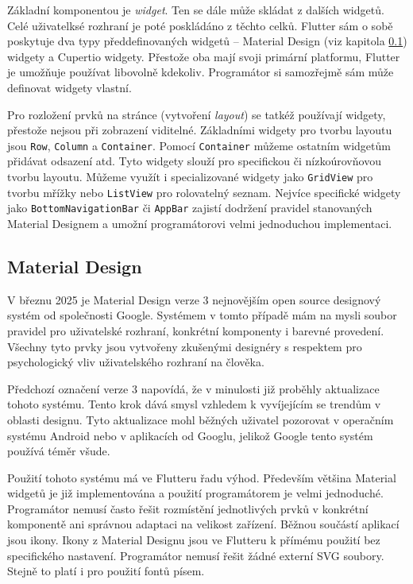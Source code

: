 \documentclass[
  biblatex,
  figures=true,
  tables=false,
  glossaries,
  index
]{kidiplom}
\begin{document}
Základní komponentou je \textit{widget}. Ten se dále může skládat z dalších widgetů. Celé uživatelksé rozhraní je poté poskládáno z těchto celků. Flutter sám o sobě poskytuje dva typy předdefinovaných widgetů -- Material Design (viz kapitola \ref{Material Design}) widgety a Cupertio widgety. Přestože oba mají svoji primární platformu, Flutter je umožňuje používat libovolně kdekoliv. Programátor si samozřejmě sám může definovat widgety vlastní.

Pro rozložení prvků na stránce (vytvoření \textit{layout}) se tatkéž používají widgety, přestože nejsou při zobrazení viditelné. Základními widgety pro tvorbu layoutu jsou \verb|Row|, \verb|Column| a \verb|Container|. Pomocí \verb|Container| můžeme ostatním widgetům přidávat odsazení atd. Tyto widgety slouží pro specifickou či nízkoúrovňovou tvorbu layoutu. Můžeme využít i specializované widgety jako \verb|GridView| pro tvorbu mřížky nebo \verb|ListView| pro rolovatelný seznam. Nejvíce specifické widgety jako \verb|BottomNavigationBar| či \verb|AppBar| zajistí dodržení pravidel stanovaných Material Designem a umožní programátorovi velmi jednoduchou implementaci.

\subsection{Material Design} \label{Material Design}
V březnu 2025 je Material Design verze 3 \cite{m3} nejnovějším open source designový systém od společnosti Google. Systémem v tomto případě mám na mysli soubor pravidel pro uživatelské rozhraní, konkrétní komponenty i barevné provedení. Všechny tyto prvky jsou vytvořeny zkušenými designéry s respektem pro psychologický vliv uživatelského rozhraní na člověka.

Předchozí označení verze 3 napovídá, že v minulosti již proběhly aktualizace tohoto systému. Tento krok dává smysl vzhledem k vyvíjejícím se trendům v oblasti designu. Tyto aktualizace mohl běžných uživatel pozorovat v operačním systému Android nebo v aplikacích od Googlu, jelikož Google tento systém používá téměr všude.

Použití tohoto systému má ve Flutteru řadu výhod. Především většina Material widgetů je již implementována \cite{m3-components} a použití programátorem je velmi jednoduché. Programátor nemusí často řešit rozmístění jednotlivých prvků v konkrétní komponentě ani správnou adaptaci na velikost zařízení. Běžnou součástí aplikací jsou ikony. Ikony z Material Designu jsou ve Flutteru k přímému použití bez specifického nastavení. Programátor nemusí řešit žádné externí SVG soubory. Stejně to platí i pro použití fontů písem.
\end{document}
